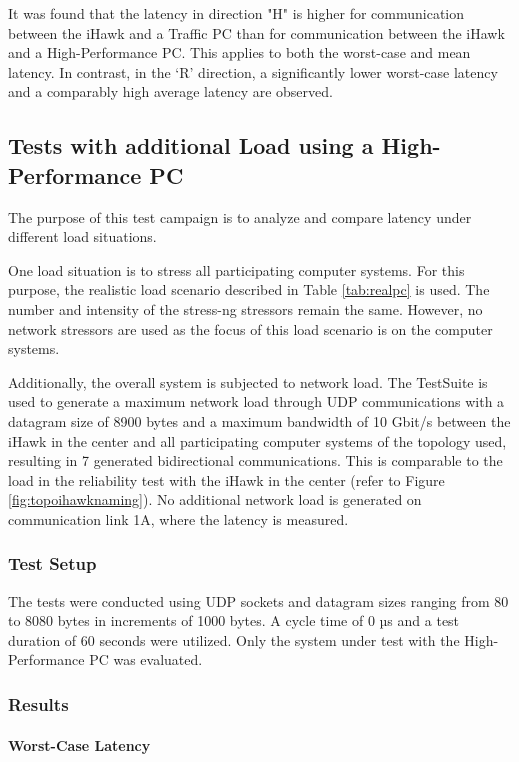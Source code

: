 It was found that the latency in direction "H" is higher for communication between the iHawk and a Traffic PC than for communication between the iHawk and a High-Performance PC. This applies to both the worst-case and mean latency. In contrast, in the `R' direction, a significantly lower worst-case latency and a comparably high average latency are observed.


\subsection{Tests with additional Load using a High-Performance PC}
The purpose of this test campaign is to analyze and compare latency under different load situations.

One load situation is to stress all participating computer systems. For this purpose, the realistic load scenario described in Table \ref{tab:realpc} is used. The number and intensity of the stress-ng stressors remain the same. However, no network stressors are used as the focus of this load scenario is on the computer systems.

Additionally, the overall system is subjected to network load. The TestSuite is used to generate a maximum network load through UDP communications with a datagram size of 8900 bytes and a maximum bandwidth of 10 Gbit/s between the iHawk in the center and all participating computer systems of the topology used, resulting in 7 generated bidirectional communications. This is comparable to the load in the reliability test with the iHawk in the center (refer to Figure \ref{fig:topoihawknaming}). No additional network load is generated on communication link 1A, where the latency is measured.

\subsubsection{Test Setup}
The tests were conducted using UDP sockets and datagram sizes ranging from 80 to 8080 bytes in increments of 1000 bytes. A cycle time of 0 µs and a test duration of 60 seconds were utilized. Only the system under test with the High-Performance PC was evaluated.

\subsubsection{Results}
\paragraph{Worst-Case Latency}

